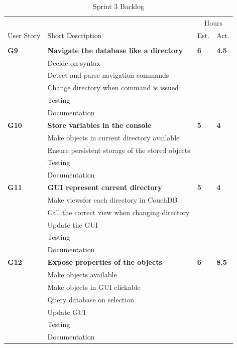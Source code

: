 \begin{table}
\caption{Sprint 3 Backlog}
\centering
\begin{tabular}{ l p{8cm} l l }
\hline 
			&				&\multicolumn{2}{c}{Hours}			\\
 User Story	& Short Description		&Est.		&Act.	                               \\ 
\hline \\ [-2.0ex]
 
\bf{G9}     &\bf{Navigate the database like a directory}		&\bf{6}		&\bf{4.5}          \\ 
		  &Decide on syntax						&			&		\\
		  &Detect and parse navigation commands	&			&		\\
		  &Change directory when command is issued&			&		\\
		  &Testing							&			&		\\
		  &Documentation						&			&		\\

 \bf{G10}     &\bf{Store variables in the console} 				&\bf{5}		&\bf{4}               \\ 
		  &Make objects in current directory available		&			&		\\
		  &Ensure persistent storage of the stored objects	&			&		\\
		  &Testing								&			&		\\
		  &Documentation							&			&		\\

 \bf{G11}     &\bf{GUI represent current directory} 			&\bf{5}		&\bf{4}		     \\ 
		  &Make viewsfor each directory in CouchDB		&			&		\\
		  &Call the correct view when changing directory	&			&		\\
		  &Update the GUI							&			&		\\
		  &Testing								&			&		\\
		  &Documentation							&			&		\\

 \bf{G12}   	&\bf{Expose properties of the objects}			&\bf{6}		&\bf{8.5}		     \\ 
		  &Make objects available						&			&		\\
		  &Make objects in GUI clickable				&			&		\\
		  &Query database on selection				&			&		\\
		  &Update GUI								&			&		\\
		  &Testing								&			&		\\
		  &Documentation							&			&		\\


\end{tabular}
\end{table}
